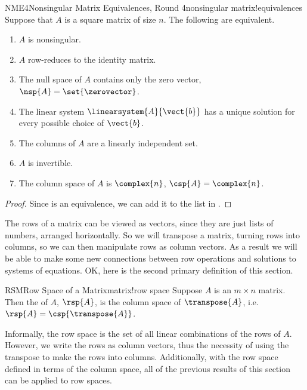 %
\begin{theorem}{NME4}{Nonsingular Matrix Equivalences, Round 4}{nonsingular matrix!equivalences}
Suppose that $A$ is a square matrix of size $n$.  The following are equivalent.
%
\begin{enumerate}
\item $A$ is nonsingular.
\item $A$ row-reduces to the identity matrix.
\item The null space of $A$ contains only the zero vector, $\nsp{A}=\set{\zerovector}$.
\item The linear system $\linearsystem{A}{\vect{b}}$ has a unique solution for every possible choice of $\vect{b}$.
\item The columns of $A$ are a linearly independent set.
\item $A$ is invertible.
\item The column space of $A$ is $\complex{n}$, $\csp{A}=\complex{n}$.
\end{enumerate}
\end{theorem}
%
\begin{proof}
Since  is an equivalence, we can add it to the list in .
\end{proof}
%
%
%
The rows of a matrix can be viewed as vectors, since they are just lists of numbers, arranged horizontally.  So we will transpose a matrix, turning rows into columns, so we can then manipulate rows as column vectors.  As a result we will be able to make some new connections between row operations and solutions to systems of equations.  OK, here is the second primary definition of this section.\par
%
\begin{definition}{RSM}{Row Space of a Matrix}{matrix!row space}
Suppose $A$ is an $m\times n$ matrix.  Then the  of $A$, $\rsp{A}$, is the column space of $\transpose{A}$, i.e.\ $\rsp{A}=\csp{\transpose{A}}$.
\end{definition}
%
Informally, the row space is the set of all linear combinations of the rows of $A$.  However, we write the rows as column vectors, thus the necessity of using the transpose to make the rows into columns.   Additionally, with the row space defined in terms of the column space, all of the previous results of this section can be applied to row spaces.\par
